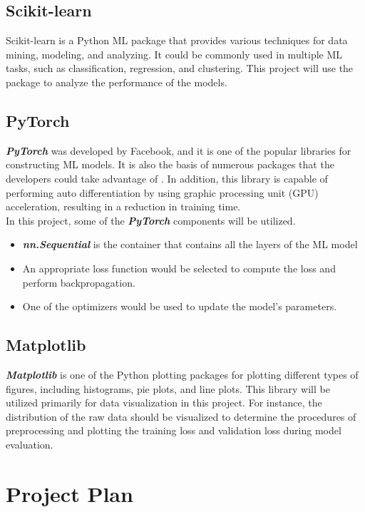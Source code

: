 \documentclass[12pt,twoside]{report}
\begin{document}
\section{Scikit-learn}
Scikit-learn is a Python ML package that provides various techniques for data mining, modeling, and analyzing. It could be commonly used in multiple ML tasks, such as classification, regression, and clustering. This project will use the package to analyze the performance of the models.

\section{PyTorch}
\textbf{\textit{PyTorch}} was developed by Facebook, and it is one of the popular libraries for constructing ML models. It is also the basis of numerous packages that the developers could take advantage of \citep{RN5}. In addition, this library is capable of performing auto differentiation by using graphic processing unit (GPU) acceleration, resulting in a reduction in training time. 
\\

In this project, some of the \textbf{\textit{PyTorch}} components will be utilized.
\begin{itemize}
	\item \textbf{\textit{nn.Sequential}} is the container that contains all the layers of the ML model
	\item An appropriate loss function would be selected to compute the loss and perform backpropagation. 
	\item One of the optimizers would be used to update the model's parameters. 
\end{itemize}

\section{Matplotlib}
\textbf{\textit{Matplotlib}} is one of the Python plotting packages for plotting different types of figures, including histograms, pie plots, and line plots. This library will be utilized primarily for data visualization in this project. For instance, the distribution of the raw data should be visualized to determine the procedures of preprocessing and plotting the training loss and validation loss during model evaluation. 



\chapter{Project Plan}
\end{document}
